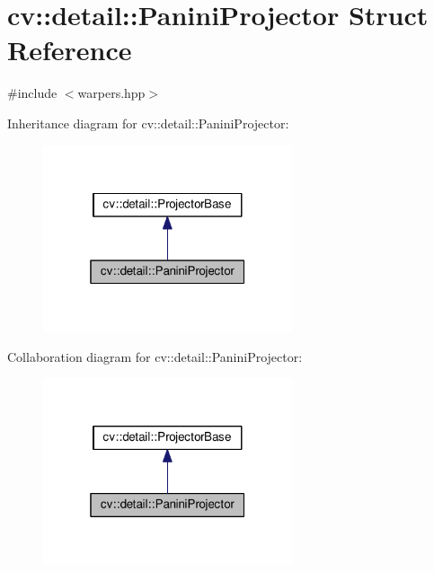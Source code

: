 \hypertarget{structcv_1_1detail_1_1PaniniProjector}{\section{cv\-:\-:detail\-:\-:Panini\-Projector Struct Reference}
\label{structcv_1_1detail_1_1PaniniProjector}
}


{\ttfamily \#include $<$warpers.\-hpp$>$}



Inheritance diagram for cv\-:\-:detail\-:\-:Panini\-Projector\-:\nopagebreak
\begin{figure}[H]
\begin{center}
\leavevmode
\includegraphics[width=208pt]{structcv_1_1detail_1_1PaniniProjector__inherit__graph}
\end{center}
\end{figure}


Collaboration diagram for cv\-:\-:detail\-:\-:Panini\-Projector\-:\nopagebreak
\begin{figure}[H]
\begin{center}
\leavevmode
\includegraphics[width=208pt]{structcv_1_1detail_1_1PaniniProjector__coll__graph}
\end{center}
\end{figure}
